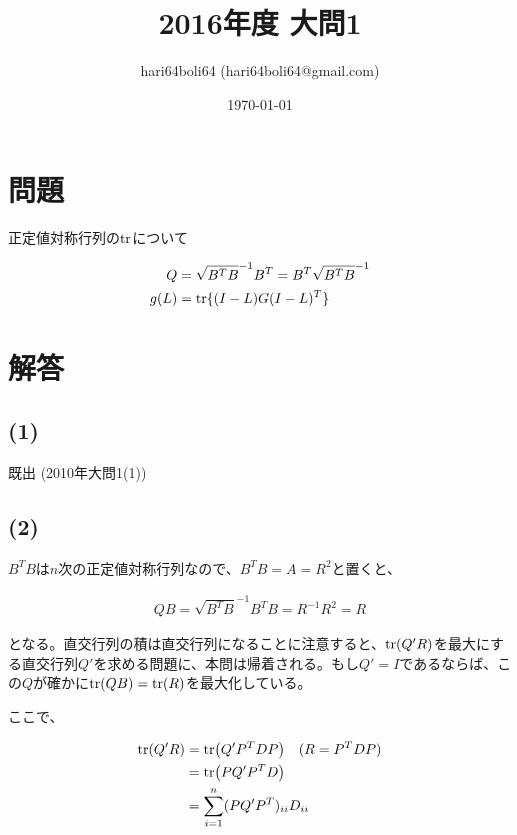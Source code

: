\documentclass[a4paper, 10pt, dvipdfmx]{jlreq}
\begin{document}
\title{2016年度 大問1}
\author{hari64boli64 (hari64boli64@gmail.com)}
\date{\today}
\maketitle

\section{問題}

正定値対称行列の$\tr$について

\begin{align*}
  Q    & =\sqrt{B^TB}^{-1}B^T=B^T \sqrt{B^TB}^{-1} \\
  g(L) & =\tr\{(I-L)G(I-L)^T\}                     \\
\end{align*}

\section{解答}

\subsection*{(1)}

既出 (2010年大問1(1))

\subsection*{(2)}

$B^TB$は$n$次の正定値対称行列なので、$B^TB=A=R^2$と置くと、

\begin{align*}
  QB=\sqrt{B^TB}^{-1}B^TB=R^{-1}R^2=R
\end{align*}

となる。直交行列の積は直交行列になることに注意すると、$\tr(Q'R)$を最大にする直交行列$Q'$を求める問題に、本問は帰着される。もし$Q'=I$であるならば、この$Q$が確かに$\tr(QB)=\tr(R)$を最大化している。

ここで、

\begin{align*}
  \tr(Q'R) & =\tr(Q'P^TDP) \quad (R=P^TDP)      \\
           & =\tr(PQ'P^TD)                      \\
           & =\sum_{i=1}^{n}(PQ'P^T)_{ii}D_{ii} \\
\end{align*}
\end{document}
